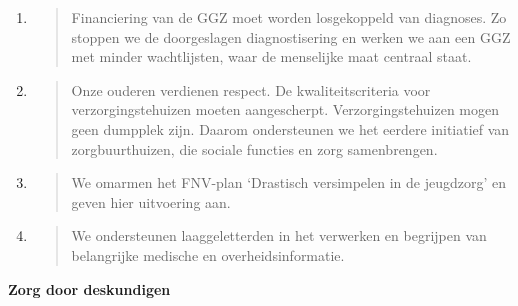 \begin{enumerate}
\def\labelenumi{\arabic{enumi}.}
\setcounter{enumi}{5}
\item
  \begin{quote}
  Financiering van de GGZ moet worden losgekoppeld van diagnoses. Zo
  stoppen we de doorgeslagen diagnostisering en werken we aan een GGZ
  met minder wachtlijsten, waar de menselijke maat centraal staat.
  \end{quote}
\item
  \begin{quote}
  Onze ouderen verdienen respect. De kwaliteitscriteria voor
  verzorgingstehuizen moeten aangescherpt. Verzorgingstehuizen mogen
  geen dumpplek zijn. Daarom ondersteunen we het eerdere initiatief van
  zorgbuurthuizen, die sociale functies en zorg samenbrengen.
  \end{quote}
\item
  \begin{quote}
  We omarmen het FNV-plan `Drastisch versimpelen in de jeugdzorg' en
  geven hier uitvoering aan.
  \end{quote}
\item
  \begin{quote}
  We ondersteunen laaggeletterden in het verwerken en begrijpen van
  belangrijke medische en overheidsinformatie.
  \end{quote}
\end{enumerate}

\textbf{Zorg door deskundigen}

